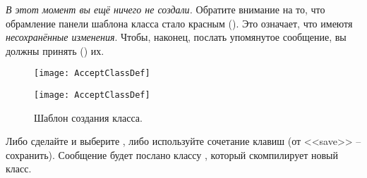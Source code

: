 \documentclass[a4paper,10pt,twoside]{book}
\begin{document}
\emph{В этот момент вы ещё ничего не создали.}
Обратите внимание на то, что обрамление панели шаблона класса стало красным ().
Это означает, что имеютя \emph{несохранённые изменения}.
Чтобы, наконец, послать упомянутое сообщение, вы должны принять () их.

\begin{figure}[h!t]
\ifluluelse
	{\centerline {\texttt{[image: AcceptClassDef]}}}
	{\centerline {\texttt{[image: AcceptClassDef]}}}
\caption{Шаблон создания класса.
}
\end{figure}

Либо сделайте \actclick и выберите , либо используйте сочетание клавиш  (от <<save>> -- сохранить).
Сообщение будет послано классу , который скомпилирует новый класс.
\end{document}
